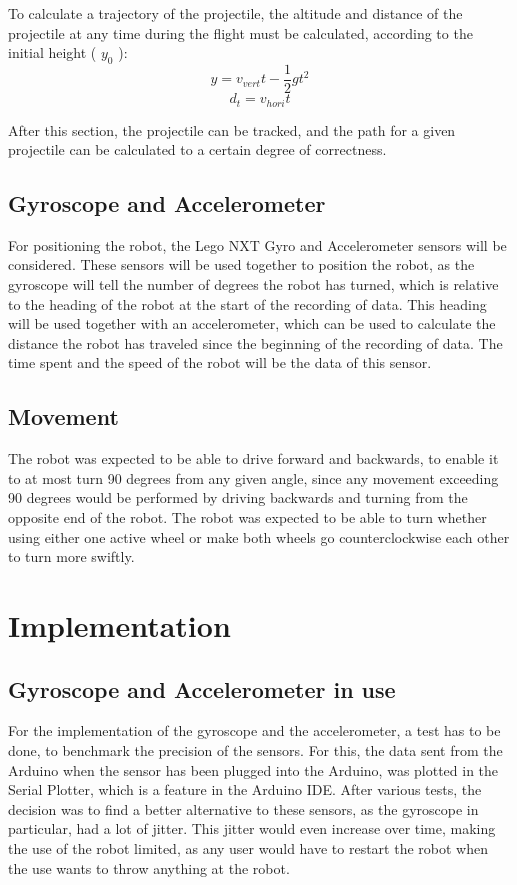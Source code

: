 To calculate a trajectory of the projectile, the altitude and distance of the projectile at any time during the flight must be calculated, according to the initial height ( \(y_{0}\) ):
\[y = v_{vert}t - \dfrac{1}{2} gt^2\]
\[d_{t} = v_{hori}t\]

After this section, the projectile can be tracked, and the path for a given projectile can be calculated to a certain degree of correctness. 

\subsection{Gyroscope and Accelerometer}
\label{sec:i1Gyroscope and Accelerometer}
For positioning the robot, the Lego NXT Gyro and Accelerometer sensors will be considered. These sensors will be used together to position the robot, as the gyroscope will tell the number of degrees the robot has turned, which is relative to the heading of the robot at the start of the recording of data. This heading will be used together with an accelerometer, which can be used to calculate the distance the robot has traveled since the beginning of the recording of data. The time spent and the speed of the robot will be the data of this sensor.


\subsection{Movement}
\label{sec:i1Movement}
The robot was expected to be able to drive forward and backwards, to enable it to at most turn 90 degrees from any given angle, since any movement exceeding 90 degrees would be performed by driving backwards and turning from the opposite end of the robot. The robot was expected to be able to turn whether using either one active wheel or make both wheels go counterclockwise each other to turn more swiftly.


\section{Implementation}
\label{sec:i1Implementation}

\subsection{Gyroscope and Accelerometer in use}
\label{sec:i1Gyroscope and Accelerometer in use}
For the implementation of the gyroscope and the accelerometer, a test has to be done, to benchmark the precision of the sensors. For this, the data sent from the Arduino when the sensor has been plugged into the Arduino, was plotted in the Serial Plotter, which is a feature in the Arduino IDE. After various tests, the decision was to find a better alternative to these sensors, as the gyroscope in particular, had a lot of jitter. This jitter would even increase over time, making the use of the robot limited, as any user would have to restart the robot when the use wants to throw anything at the robot.

